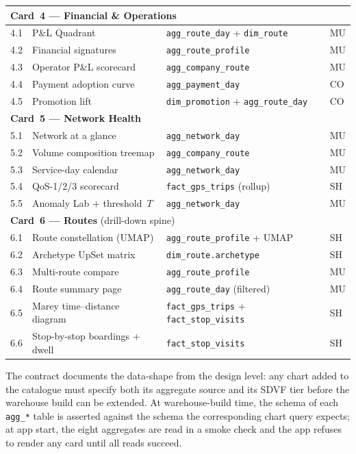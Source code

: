 \begin{table}[H]
\begin{tabularx}{\linewidth}{p{0.9cm}Xp{4.2cm}p{1.0cm}}
\hline
\multicolumn{4}{l}{\textbf{Card~4 --- Financial \& Operations}} \\
\hline
4.1 & P\&L Quadrant & \texttt{agg\_route\_day} + \texttt{dim\_route} & MU \\
4.2 & Financial signatures & \texttt{agg\_route\_profile} & MU \\
4.3 & Operator P\&L scorecard & \texttt{agg\_company\_route} & MU \\
4.4 & Payment adoption curve & \texttt{agg\_payment\_day} & CO \\
4.5 & Promotion lift & \texttt{dim\_promotion} + \texttt{agg\_route\_day} & CO \\
\hline
\multicolumn{4}{l}{\textbf{Card~5 --- Network Health}} \\
\hline
5.1 & Network at a glance & \texttt{agg\_network\_day} & MU \\
5.2 & Volume composition treemap & \texttt{agg\_company\_route} & MU \\
5.3 & Service-day calendar & \texttt{agg\_network\_day} & MU \\
5.4 & QoS-1/2/3 scorecard & \texttt{fact\_gps\_trips} (rollup) & SH \\
5.5 & Anomaly Lab + threshold~$T$ & \texttt{agg\_network\_day} & MU \\
\hline
\multicolumn{4}{l}{\textbf{Card~6 --- Routes} (drill-down spine)} \\
\hline
6.1 & Route constellation (UMAP) & \texttt{agg\_route\_profile} + UMAP & SH \\
6.2 & Archetype UpSet matrix & \texttt{dim\_route.archetype} & SH \\
6.3 & Multi-route compare & \texttt{agg\_route\_profile} & MU \\
6.4 & Route summary page & \texttt{agg\_route\_day} (filtered) & MU \\
6.5 & Marey time--distance diagram & \texttt{fact\_gps\_trips} + \texttt{fact\_stop\_visits} & SH \\
6.6 & Stop-by-stop boardings + dwell & \texttt{fact\_stop\_visits} & SH \\
\hline
\end{tabularx}
\end{table}

The contract documents the data-shape from the design level: any
chart added to the catalogue must specify both its aggregate
source and its SDVF tier before the warehouse build can be
extended. At warehouse-build time, the schema of each
\texttt{agg\_*} table is asserted against the schema the
corresponding chart query expects; at app start, the eight
aggregates are read in a smoke check and the app refuses to
render any card until all reads succeed.

